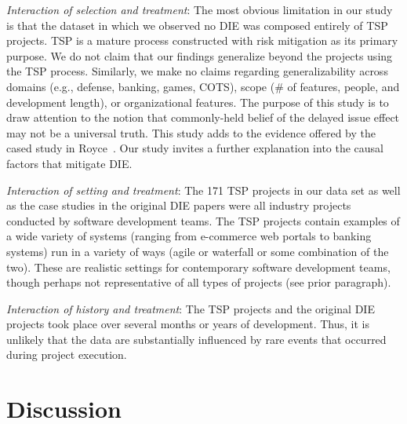 \documentclass[smallcondensed]{svjour3}
\begin{document}
\textit{Interaction of selection and treatment}: The most obvious limitation in our study is that the dataset in which we observed no DIE was composed entirely of TSP projects. TSP is a mature process constructed with risk mitigation as its primary purpose. We do not claim that our findings generalize beyond the projects using the TSP process. Similarly, we make no claims regarding generalizability across domains (e.g., defense, banking, games, COTS), scope (\# of features, people, and development length), or organizational features. The purpose of this study is to draw attention to the notion that commonly-held belief of the delayed issue effect may not be a universal truth. This study adds to the evidence offered by the cased study in Royce~\cite{Royce98}. Our study invites a further explanation into the causal factors that mitigate DIE.



\textit{Interaction of setting and treatment}: The 171 TSP projects in our data set as well as the case studies in the original DIE papers were all industry projects conducted by software development teams. The TSP projects contain examples of a wide variety
 of systems (ranging from e-commerce web portals to  banking systems) run in a variety of
 ways (agile or  waterfall or some combination of the two). These are realistic settings for contemporary software development teams, though perhaps not representative of all types of projects (see prior paragraph). 


\textit{Interaction of history and treatment}: The TSP projects and the original DIE projects took place over several months or years of development. Thus, it is unlikely that the data are substantially influenced by rare events that occurred during project execution.


 
 \section{Discussion}
 \label{sect:discussion}
\end{document}
